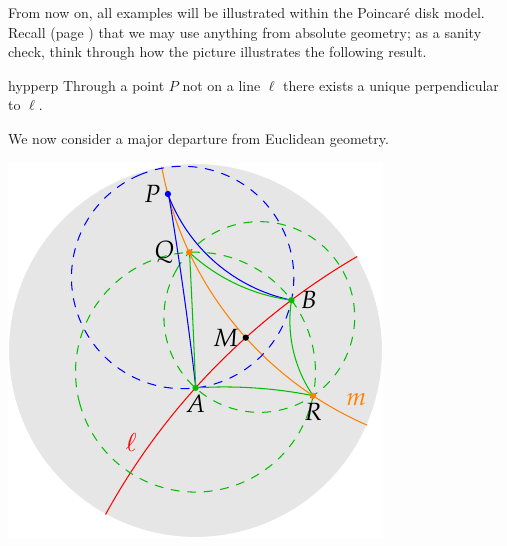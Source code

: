 \begin{minipage}[t]{0.65\linewidth}\vspace{-8pt}
	From now on, all examples will be illustrated within the Poincaré disk model. Recall (page \pageref{sec:hyp1}) that we may use anything from absolute geometry; as a sanity check, think through how the picture illustrates the following result.
	
	\begin{lemm}{}{hypperp}
		Through a point $P$ not on a line $\ell$ there exists a unique perpendicular to $\ell$. 
	\end{lemm}
	
	We now consider a major departure from Euclidean geometry.
\end{minipage}
\hfill
\begin{minipage}[t]{0.34\linewidth}\vspace{-28pt}
	\flushright\includegraphics[scale=0.75]{basic-perp}
\end{minipage}

